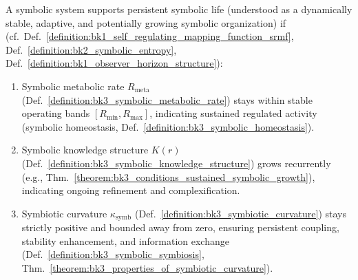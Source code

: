 \begin{theorem} \label{theorem:bk3_criteria_persistent_symbolic_life}
A symbolic system supports persistent symbolic life (understood as a dynamically stable, adaptive, and potentially growing symbolic organization) if (cf.~Def.~\ref{definition:bk1_self_regulating_mapping_function_srmf}, Def.~\ref{definition:bk2_symbolic_entropy}, Def.~\ref{definition:bk1_observer_horizon_structure}):
\begin{enumerate}
    \item Symbolic metabolic rate $R_{\text{meta}}$
    (Def.~\ref{definition:bk3_symbolic_metabolic_rate}) stays within stable
    operating bands $[R_{\text{min}}, R_{\text{max}}]$, indicating sustained
    regulated activity (symbolic homeostasis,
    Def.~\ref{definition:bk3_symbolic_homeostasis}).
    \item Symbolic knowledge structure $K(r)$
    (Def.~\ref{definition:bk3_symbolic_knowledge_structure}) grows recurrently
    (e.g., Thm.~\ref{theorem:bk3_conditions_sustained_symbolic_growth}),
    indicating ongoing refinement and complexification.
    \item Symbiotic curvature $\kappa_{\text{symb}}$
    (Def.~\ref{definition:bk3_symbiotic_curvature}) stays strictly positive and
    bounded away from zero, ensuring persistent coupling, stability
    enhancement, and information exchange
    (Def.~\ref{definition:bk3_symbolic_symbiosis},
    Thm.~\ref{theorem:bk3_properties_of_symbiotic_curvature}).
\end{enumerate}
\end{theorem}

